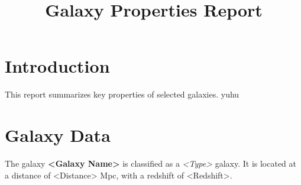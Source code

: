 \documentclass{article}
\title{Galaxy Properties Report}
\author{}
\date{}
\begin{document}
\maketitle

\section{Introduction}
This report summarizes key properties of selected galaxies. yuhu

\section{Galaxy Data}
The galaxy \textbf{<Galaxy Name>} is classified as a \textit{<Type>} galaxy. 
It is located at a distance of <Distance> Mpc, with a redshift of <Redshift>.
\end{document}
